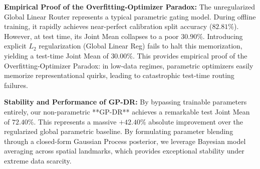 \textbf{Empirical Proof of the Overfitting-Optimizer Paradox:} 
The unregularized Global Linear Router represents a typical parametric gating model. During offline training, it rapidly achieves near-perfect calibration split accuracy ($82.81\%$). However, at test time, its Joint Mean collapses to a poor \textbf{$30.90\%$}. Introducing explicit $L_2$ regularization (Global Linear Reg) fails to halt this memorization, yielding a test-time Joint Mean of \textbf{$30.00\%$}. This provides empirical proof of the Overfitting-Optimizer Paradox: in low-data regimes, parametric optimizers easily memorize representational quirks, leading to catastrophic test-time routing failures.

\textbf{Stability and Performance of GP-DR:}
By bypassing trainable parameters entirely, our non-parametric **GP-DR** achieves a remarkable test Joint Mean of \textbf{$72.40\%$}. This represents a massive \textbf{$+42.40\%$} absolute improvement over the regularized global parametric baseline. By formulating parameter blending through a closed-form Gaussian Process posterior, we leverage Bayesian model averaging across spatial landmarks, which provides exceptional stability under extreme data scarcity.

